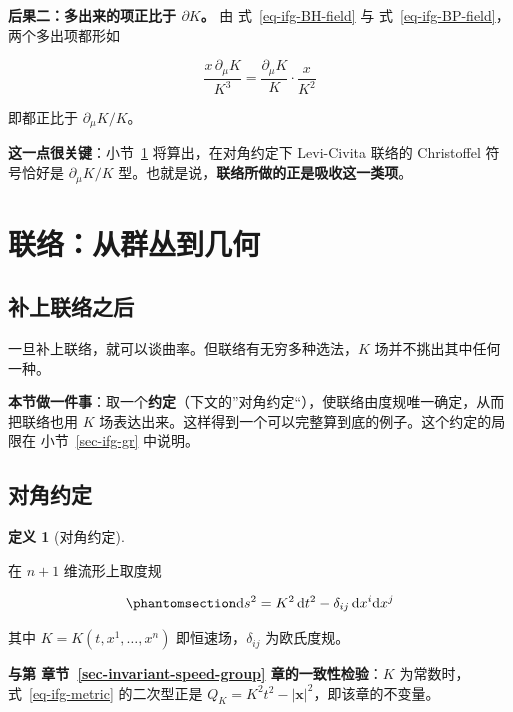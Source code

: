 \documentclass[
  chinese,
  a4paper,
  UTF8,
  12pt,
  oneside,
  openany]{ctexbook}
\theoremstyle{plain}
\theoremstyle{plain}
\theoremstyle{plain}
\theoremstyle{definition}
\newtheorem{definition}{定义}[chapter]
\theoremstyle{plain}
\theoremstyle{plain}
\theoremstyle{remark}
\begin{document}
\textbf{后果二：多出来的项正比于 \(\partial K\)。} 由
式~\ref{eq-ifg-BH-field} 与 式~\ref{eq-ifg-BP-field}，两个多出项都形如

\[
\frac{x\,\partial_\mu K}{K^{3}}
=\frac{\partial_\mu K}{K}\cdot\frac{x}{K^{2}}
\]

即都正比于 \(\partial_\mu K/K\)。

\textbf{这一点很关键}：小节~\ref{sec-ifg-connection}
将算出，在对角约定下 Levi-Civita 联络的 Christoffel 符号恰好是
\(\partial_\mu K/K\) 型。也就是说，\textbf{联络所做的正是吸收这一类项}。

\section{联络：从群丛到几何}\label{sec-ifg-connection}

\subsection{补上联络之后}\label{ux8865ux4e0aux8054ux7edcux4e4bux540e}

一旦补上联络，就可以谈曲率。但联络有无穷多种选法，\(K\)
场并不挑出其中任何一种。

\textbf{本节做一件事}：取一个\textbf{约定}（下文的''对角约定``），使联络由度规唯一确定，从而把联络也用
\(K\) 场表达出来。这样得到一个可以完整算到底的例子。这个约定的局限在
小节~\ref{sec-ifg-gr} 中说明。

\subsection{对角约定}\label{ux5bf9ux89d2ux7ea6ux5b9a}

\begin{definition}[对角约定]\protect\hypertarget{def-ifg-diagonal}{}\label{def-ifg-diagonal}

在 \(n+1\) 维流形上取度规

\begin{equation}\protect\phantomsection\label{eq-ifg-metric}{
\mathrm{d}s^{2}=K^{2}\,\mathrm{d}t^{2}-\delta_{ij}\,\mathrm{d}x^{i}\mathrm{d}x^{j}
}\end{equation}

其中 \(K=K(t,x^{1},\dots,x^{n})\) 即恒速场，\(\delta_{ij}\) 为欧氏度规。

\end{definition}

\textbf{与第 章节~\ref{sec-invariant-speed-group} 章的一致性检验}：\(K\)
为常数时，式~\ref{eq-ifg-metric} 的二次型正是
\(Q_K=K^{2}t^{2}-\lvert\mathbf{x}\rvert^{2}\)，即该章的不变量。
\end{document}
